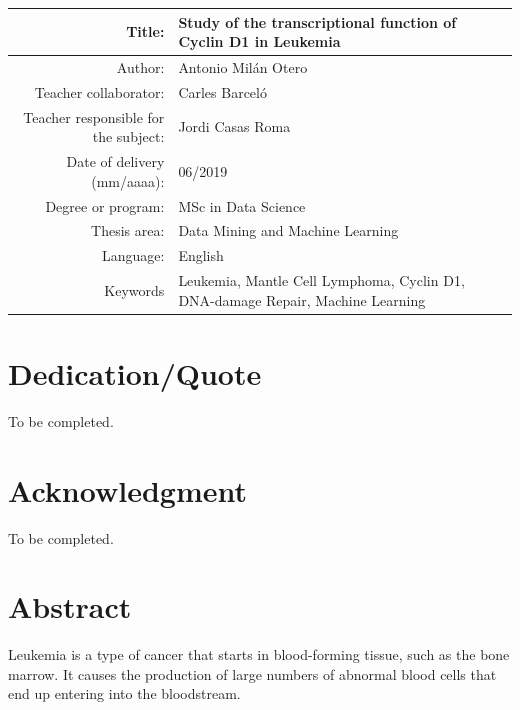 \begin{table}[ht]
	\centering{}
	\renewcommand{\arraystretch}{2}
	\begin{tabular}{r | p{8cm}}
		\hline
		Title: & Study of the transcriptional function \newline of Cyclin D1 in Leukemia\\
		\hline
        Author: & Antonio Milán Otero\\
		\hline
        Teacher collaborator: & Carles Barceló\\
		\hline
        Teacher responsible for the subject: & Jordi Casas Roma\\
		\hline
        Date of delivery (mm/aaaa): & 06/2019\\
		\hline
        Degree or program: & MSc in Data Science\\
		\hline
        Thesis area: & Data Mining and Machine Learning\\
		\hline
        Language: & English\\
		\hline
        Keywords & Leukemia, Mantle Cell Lymphoma, Cyclin D1, DNA-damage Repair, Machine Learning\\
		\hline
	\end{tabular}
\end{table}

\chapter*{Dedication/Quote}

To be completed.

\chapter*{Acknowledgment}

To be completed.

\chapter*{Abstract}

\onehalfspacing

Leukemia is a type of cancer that starts in blood-forming tissue, such as the bone marrow. It causes the production of large numbers of abnormal blood cells that end up entering into the bloodstream. 

